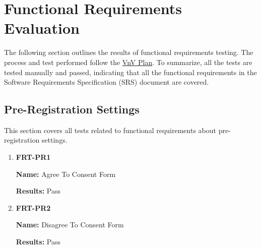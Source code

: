 \documentclass[12pt, titlepage]{article}
\begin{document}
\section{Functional Requirements Evaluation}
The following section outlines the results of functional requirements testing. The process and test performed follow the \href{https://github.com/beatlepie/4G06CapstoneProjectTeam2/blob/main/docs/VnVPlan/VnVPlan.pdf}{VnV Plan}. To summarize, all the tests are tested manually and passed, indicating that all the functional requirements in the Software Requirements Specification (SRS) document are covered.

\subsection{Pre-Registration Settings}
This section covers all tests related to functional requirements about pre-registration settings.
\begin{enumerate}
\item \textbf{FRT-PR1}

\textbf{Name:} Agree To Consent Form

\textbf{Results:} Pass

\item \textbf{FRT-PR2}

\textbf{Name:} Disagree To Consent Form

\textbf{Results:} Pass
\end{enumerate}
\end{document}
